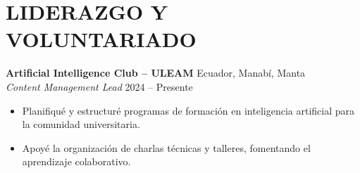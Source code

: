 \documentclass[11pt, a4paper]{article}
\begin{document}
\section*{LIDERAZGO Y VOLUNTARIADO}

\textbf{Artificial Intelligence Club -- ULEAM} \hfill Ecuador, Manabí, Manta \\
\textit{Content Management Lead} \hfill 2024 -- Presente

\begin{itemize}
\item Planifiqué y estructuré programas de formación en inteligencia artificial para la comunidad universitaria.
\item Apoyé la organización de charlas técnicas y talleres, fomentando el aprendizaje colaborativo.
\end{itemize}
\end{document}
